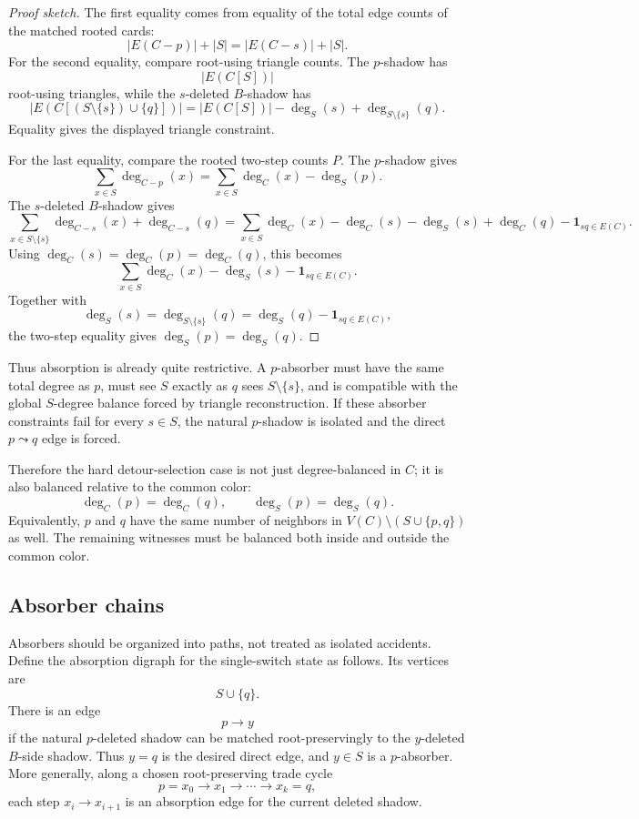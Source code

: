 \documentclass[11pt]{article}
\newcommand{\one}{\mathbf{1}}
\begin{document}
\begin{proof}[Proof sketch]
The first equality comes from equality of the total edge counts of the
matched rooted cards:
\[
  |E(C-p)|+|S|
  =
  |E(C-s)|+|S|.
\]
For the second equality, compare root-using triangle counts.  The \(p\)-shadow
has
\[
  |E(C[S])|
\]
root-using triangles, while the \(s\)-deleted \(B\)-shadow has
\[
  |E(C[(S\setminus\{s\})\cup\{q\}])|
  =
  |E(C[S])|-\deg_S(s)+\deg_{S\setminus\{s\}}(q).
\]
Equality gives the displayed triangle constraint.

For the last equality, compare the rooted two-step counts \(P\).  The
\(p\)-shadow gives
\[
  \sum_{x\in S}\deg_{C-p}(x)
  =
  \sum_{x\in S}\deg_C(x)-\deg_S(p).
\]
The \(s\)-deleted \(B\)-shadow gives
\[
  \sum_{x\in S\setminus\{s\}}\deg_{C-s}(x)+\deg_{C-s}(q)
  =
  \sum_{x\in S}\deg_C(x)-\deg_C(s)-\deg_S(s)+\deg_C(q)-\one_{sq\in E(C)}.
\]
Using \(\deg_C(s)=\deg_C(p)=\deg_C(q)\), this becomes
\[
  \sum_{x\in S}\deg_C(x)-\deg_S(s)-\one_{sq\in E(C)}.
\]
Together with
\[
  \deg_S(s)=\deg_{S\setminus\{s\}}(q)
  =
  \deg_S(q)-\one_{sq\in E(C)},
\]
the two-step equality gives \(\deg_S(p)=\deg_S(q)\).
\end{proof}

Thus absorption is already quite restrictive.  A \(p\)-absorber must have the
same total degree as \(p\), must see \(S\) exactly as \(q\) sees
\(S\setminus\{s\}\), and is compatible with the global \(S\)-degree balance
forced by triangle reconstruction.  If these absorber constraints fail for
every \(s\in S\), the natural \(p\)-shadow is isolated and the direct
\(p\leadsto q\) edge is forced.

Therefore the hard detour-selection case is not just degree-balanced in
\(C\); it is also balanced relative to the common color:
\[
  \deg_C(p)=\deg_C(q),
  \qquad
  \deg_S(p)=\deg_S(q).
\]
Equivalently, \(p\) and \(q\) have the same number of neighbors in
\(V(C)\setminus(S\cup\{p,q\})\) as well.  The remaining witnesses must be
balanced both inside and outside the common color.

\subsection{Absorber chains}

Absorbers should be organized into paths, not treated as isolated accidents.
Define the absorption digraph for the single-switch state as follows.  Its
vertices are
\[
  S\cup\{q\}.
\]
There is an edge
\[
  p\to y
\]
if the natural \(p\)-deleted shadow can be matched root-preservingly to the
\(y\)-deleted \(B\)-side shadow.  Thus \(y=q\) is the desired direct edge,
and \(y\in S\) is a \(p\)-absorber.  More generally, along a chosen
root-preserving trade cycle
\[
  p=x_0\to x_1\to\cdots\to x_k=q,
\]
each step \(x_i\to x_{i+1}\) is an absorption edge for the current deleted
shadow.
\end{document}
